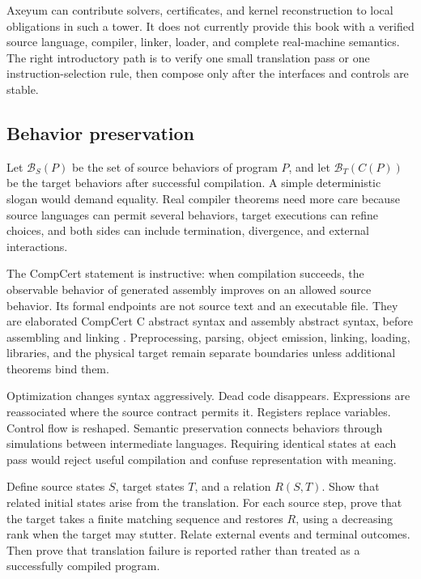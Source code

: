 Axeyum can contribute solvers, certificates, and kernel reconstruction to
local obligations in such a tower. It does not currently provide this book
with a verified source language, compiler, linker, loader, and complete
real-machine semantics. The right introductory path is to verify one small
translation pass or one instruction-selection rule, then compose only after
the interfaces and controls are stable.

\subsection{Behavior preservation}

Let \(\mathcal{B}_S(P)\) be the set of source behaviors of program \(P\), and
let \(\mathcal{B}_T(C(P))\) be the target behaviors after successful
compilation. A simple deterministic slogan would demand equality. Real
compiler theorems need more care because source languages can permit several
behaviors, target executions can refine choices, and both sides can include
termination, divergence, and external interactions.

The CompCert statement is instructive: when compilation succeeds, the
observable behavior of generated assembly improves on an allowed source
behavior. Its formal endpoints are not source text and an executable file.
They are elaborated CompCert C abstract syntax and assembly abstract syntax,
before assembling and linking \autocite{leroy2009compcert}. Preprocessing,
parsing, object emission, linking, loading, libraries, and the physical target
remain separate boundaries unless additional theorems bind them.

Optimization changes syntax aggressively. Dead code disappears. Expressions
are reassociated where the source contract permits it. Registers replace
variables. Control flow is reshaped. Semantic preservation connects behaviors
through simulations between intermediate languages. Requiring identical
states at each pass would reject useful compilation and confuse representation
with meaning.

\begin{proofkit}[title={One-pass compiler proof}]
Define source states \(S\), target states \(T\), and a relation \(R(S,T)\).
Show that related initial states arise from the translation. For each source
step, prove that the target takes a finite matching sequence and restores
\(R\), using a decreasing rank when the target may stutter. Relate external
events and terminal outcomes. Then prove that translation failure is reported
rather than treated as a successfully compiled program.
\end{proofkit}

